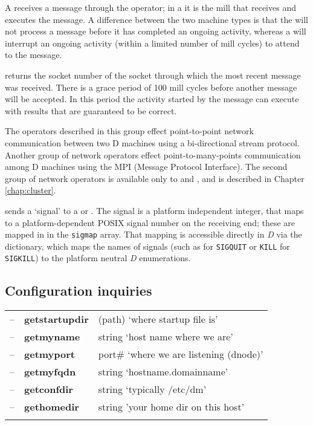 A  receives a  message through the 
operator; in a  it is the mill that receives and executes
the message. A difference between the two machine types is that the
 will not process a message before it has completed an
ongoing activity, whereas a  will interrupt an ongoing
activity (within a limited number of mill cycles) to attend to the
message.

 returns the socket number of the socket through which
the most recent message was received. There is a grace period of 100
mill cycles before another message will be accepted. In this period
the activity started by the message can execute  with
results that are guaranteed to be correct.

The operators described in this group effect point-to-point network
communication between two D machines using a bi-directional stream
protocol. Another group of network operators effect
point-to-many-points communication among D machines using the MPI
(Message Protocol Interface). The second group of network operators is
available only to  and , and
is described in Chapter \ref{chap:cluster}.

 sends a `signal' to a  or . The
signal is a platform independent integer, that maps to a
platform-dependent POSIX signal number on the receiving end; these are
mapped in  in the \texttt{sigmap} array. That
mapping is accessible directly in \emph{D} via the 
dictionary, which maps the names of signals (such as 
for \texttt{SIGQUIT} or \texttt{KILL} for \texttt{SIGKILL}) to the
platform neutral \emph{D} enumerations.

\subsection{Configuration inquiries}\label{ssec:confops}

\begin{tabular}{>{\sffamily}r>{\sffamily\bfseries}l>{\sffamily}l}
-- & getstartupdir & (path) `where startup file is'\\
-- & getmyname & string `host name where we are'\\
-- & getmyport & port\# `where we are listening (dnode)'\\
-- & getmyfqdn & string `hostname.domainname'\\
-- & getconfdir & string `typically /etc/dm'\\
-- & gethomedir & string 'your home dir on this host'\\\\
\end{tabular}

